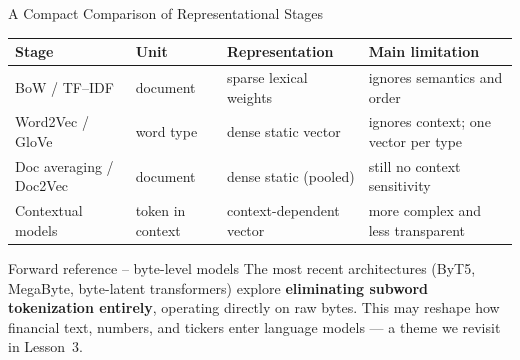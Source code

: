 \documentclass[aspectratio=169]{beamer}
\begin{document}
%
%
\begin{frame}{A Compact Comparison of Representational Stages}
\small
\begin{center}
\begin{tabular}{p{}p{}p{}p{}}
\toprule
\textbf{Stage} & \textbf{Unit} & \textbf{Representation} & \textbf{Main limitation} \\
\midrule
BoW / TF--IDF & document & sparse lexical weights & ignores semantics and order \\[3pt]
Word2Vec / GloVe & word type & dense static vector & ignores context; one vector per type \\[3pt]
Doc averaging / Doc2Vec & document & dense static (pooled) & still no context sensitivity \\[3pt]
Contextual models & token in context & context-dependent vector & more complex and less transparent \\
\bottomrule
\end{tabular}
\end{center}

\vspace{0.12cm}
\begin{alertblock}{Forward reference -- byte-level models}
The most recent architectures (ByT5, MegaByte, byte-latent transformers) explore
\textbf{eliminating subword tokenization entirely}, operating directly on raw bytes.
This may reshape how financial text, numbers, and tickers enter language models ---
a theme we revisit in Lesson~3.
\end{alertblock}
\end{frame}
%
\end{document}
